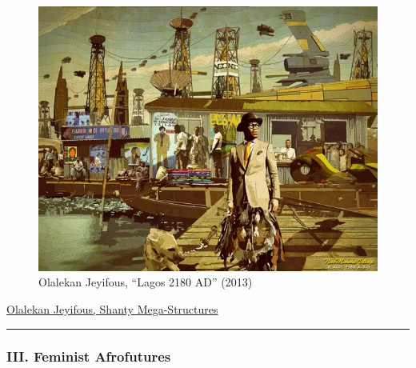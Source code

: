 \documentclass[
  letterpaper,
  DIV=11,
  numbers=noendperiod]{scrartcl}
\begin{document}
\begin{figure}

\includegraphics{../img/lagos-2180.jpg} \hfill{}

\caption{Olalekan Jeyifous, ``Lagos 2180 AD'' (2013)}

\end{figure}

\href{https://jeyifo.us/SMS}{Olalekan Jeyifous, Shanty Mega-Structures}

\begin{center}\rule{0.5\linewidth}{0.5pt}\end{center}

\hypertarget{iii.-feminist-afrofutures}{%
\subsubsection{III. Feminist
Afrofutures}\label{iii.-feminist-afrofutures}}
\end{document}
